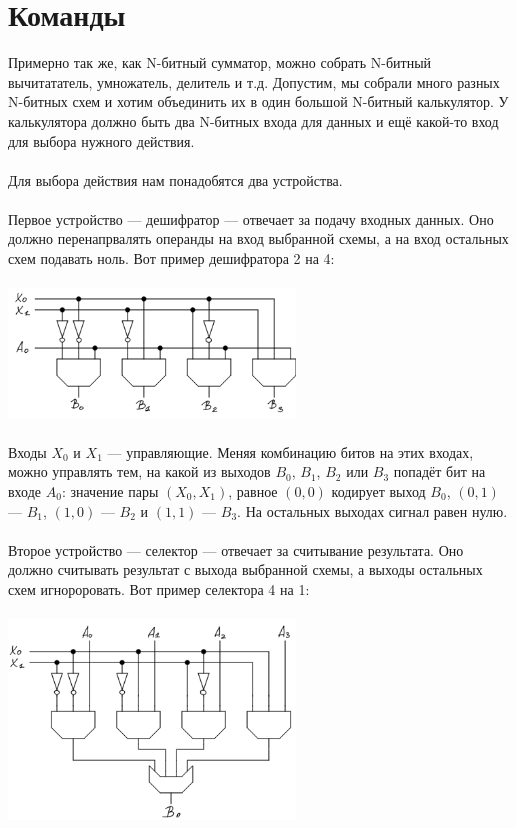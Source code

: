 \documentclass[11pt]{book}
\begin{document}
\section{Команды}
Примерно так же, как N-битный сумматор, можно собрать N-битный вычитататель, умножатель, делитель и т.д.
Допустим, мы собрали много разных N-битных схем и хотим объединить их в один большой N-битный калькулятор.
У калькулятора должно быть два N-битных входа для данных и ещё какой-то вход для выбора нужного действия.
\\ \\
Для выбора действия нам понадобятся два устройства.
\\ \\
Первое устройство --- дешифратор --- отвечает за подачу входных данных.
Оно должно перенапрвалять операнды на вход выбранной схемы, а на вход остальных схем подавать ноль.
Вот пример дешифратора 2 на 4:
\\ \\
\includegraphics[width=3in]{pic/decoder_2_to_4.png}
\\ \\
Входы $X_0$ и $X_1$ --- управляющие.
Меняя комбинацию битов на этих входах, можно управлять тем, на какой из выходов $B_0$, $B_1$, $B_2$ или $B_3$ попадёт бит на входе $A_0$:
значение пары $(X_0, X_1)$, равное $(0, 0)$ кодирует выход $B_0$, $(0, 1)$ --- $B_1$, $(1, 0)$ --- $B_2$ и $(1, 1)$ --- $B_3$.
На остальных выходах сигнал равен нулю.
\\ \\
Второе устройство --- селектор --- отвечает за считывание результата.
Оно должно считывать результат с выхода выбранной схемы, а выходы остальных схем игнороровать.
Вот пример селектора 4 на 1:
\\ \\
\includegraphics[width=3in]{pic/selector_4_to_1.png}
\end{document}

